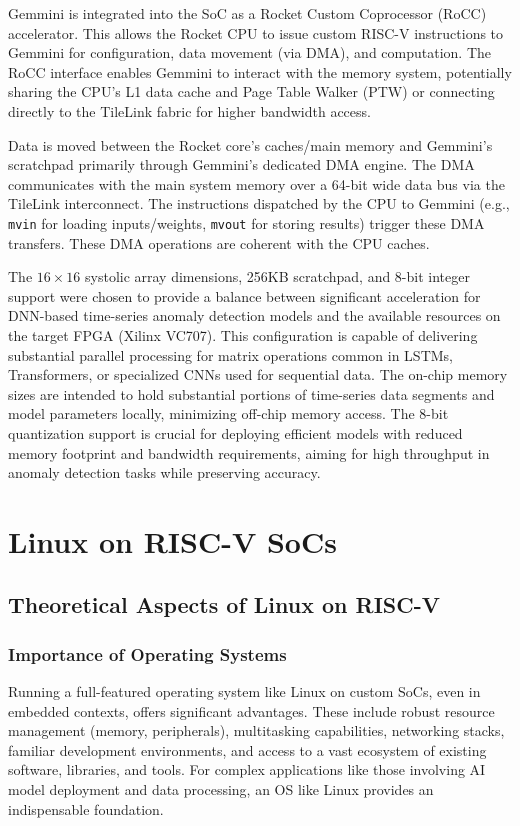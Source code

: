 Gemmini is integrated into the SoC as a Rocket Custom Coprocessor (RoCC) accelerator. This allows the Rocket CPU to issue custom RISC-V instructions to Gemmini for configuration, data movement (via DMA), and computation. The RoCC interface enables Gemmini to interact with the memory system, potentially sharing the CPU's L1 data cache and Page Table Walker (PTW) or connecting directly to the TileLink fabric for higher bandwidth access.

Data is moved between the Rocket core's caches/main memory and Gemmini's scratchpad primarily through Gemmini's dedicated DMA engine. The DMA communicates with the main system memory over a 64-bit wide data bus via the TileLink interconnect. The instructions dispatched by the CPU to Gemmini (e.g., \texttt{mvin} for loading inputs/weights, \texttt{mvout} for storing results) trigger these DMA transfers. These DMA operations are coherent with the CPU caches.

The $16 \times 16$ systolic array dimensions, 256KB scratchpad, and 8-bit integer support were chosen to provide a balance between significant acceleration for DNN-based time-series anomaly detection models and the available resources on the target FPGA (Xilinx VC707). This configuration is capable of delivering substantial parallel processing for matrix operations common in LSTMs, Transformers, or specialized CNNs used for sequential data. The on-chip memory sizes are intended to hold substantial portions of time-series data segments and model parameters locally, minimizing off-chip memory access. The 8-bit quantization support is crucial for deploying efficient models with reduced memory footprint and bandwidth requirements, aiming for high throughput in anomaly detection tasks while preserving accuracy.

\section{Linux on RISC-V SoCs}
\label{sec:linux_on_riscv}

\subsection{Theoretical Aspects of Linux on RISC-V}
\label{sec:linux_riscv_theoretical}
\subsubsection{Importance of Operating Systems}
Running a full-featured operating system like Linux on custom SoCs, even in embedded contexts, offers significant advantages. These include robust resource management (memory, peripherals), multitasking capabilities, networking stacks, familiar development environments, and access to a vast ecosystem of existing software, libraries, and tools. For complex applications like those involving AI model deployment and data processing, an OS like Linux provides an indispensable foundation.

